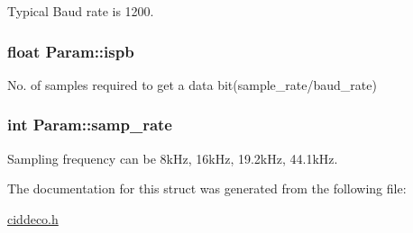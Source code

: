 Typical Baud rate is 1200. 

\hypertarget{structParam_a2c86a3473a2e28db9a42003e56e7fa23}{}
\subsubsection[{ispb}]{\setlength{\rightskip}{0pt plus 5cm}float Param\+::ispb}\label{structParam_a2c86a3473a2e28db9a42003e56e7fa23}


No. of samples required to get a data bit(sample\+\_\+rate/baud\+\_\+rate) 

\hypertarget{structParam_acbb300a28b38ec5837beb40fa7c4f3b9}{}
\subsubsection[{samp\+\_\+rate}]{\setlength{\rightskip}{0pt plus 5cm}int Param\+::samp\+\_\+rate}\label{structParam_acbb300a28b38ec5837beb40fa7c4f3b9}


Sampling frequency can be 8k\+Hz, 16k\+Hz, 19.\+2k\+Hz, 44.\+1k\+Hz. 



The documentation for this struct was generated from the following file\+:\begin{DoxyCompactItemize}
\item 
\hyperlink{ciddeco_8h}{ciddeco.\+h}\end{DoxyCompactItemize}
